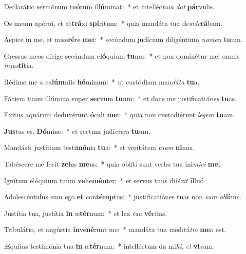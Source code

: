 \item Declarátio sermónum tu\textbf{ó}rum il\textbf{lú}minat:~* et intelléc\textit{tum} \textit{dat} \textbf{pár}vulis.
\item Os meum apérui, et at\textbf{trá}xi \textbf{spí}ritum:~* quia mandáta tua de\textit{si}\textit{de}\textbf{rá}bam.
\item Aspice in me, et mise\textbf{ré}re \textbf{me}i:~* secúndum judícium diligéntium \textit{no}\textit{men} \textbf{tu}um.
\item Gressus meos dírige secúndum e\textbf{ló}quium \textbf{tu}um:~* et non dominétur mei omnis \textit{in}\textit{jus}\textbf{tí}tia.
\item Rédime me a ca\textbf{lúm}niis \textbf{hó}minum:~* ut custódiam man\textit{dá}\textit{ta} \textbf{tu}a.
\item Fáciem tuam illúmina super \textbf{ser}vum \textbf{tu}um:~* et doce me justificati\textit{ó}\textit{nes} \textbf{tu}as.
\item Exitus aquárum deduxérunt \textbf{ó}culi \textbf{me}i:~* quia non custodiérunt \textit{le}\textit{gem} \textbf{tu}am.
\item \textbf{Jus}tus es, \textbf{Dó}mine:~* et rectum judí\textit{ci}\textit{um} \textbf{tu}um.
\item Mandásti justítiam testi\textbf{mó}nia \textbf{tu}a:~* et veritátem \textit{tu}\textit{am} \textbf{ni}mis.
\item Tabéscere me fecit \textbf{ze}lus \textbf{me}us:~* quia oblíti sunt verba tua ini\textit{mí}\textit{ci} \textbf{me}i.
\item Ignítum elóquium tuum \textbf{ve}he\textbf{mén}ter:~* et servus tuus di\textit{lé}\textit{xit} \textbf{il}lud.
\item Adolescéntulus sum ego \textbf{et} con\textbf{témp}tus:~* justificatiónes tuas non \textit{sum} \textit{ob}\textbf{lí}tus.
\item Justítia tua, justítia \textbf{in} æ\textbf{tér}num:~* et lex \textit{tu}\textit{a} \textbf{vé}ritas.
\item Tribulátio, et angústia \textbf{in}ve\textbf{né}runt me:~* mandáta tua meditá\textit{ti}\textit{o} \textbf{me}a est.
\item Æquitas testimónia tua \textbf{in} æ\textbf{tér}num:~* intelléctum da mi\textit{hi}, \textit{et} \textbf{vi}vam.
